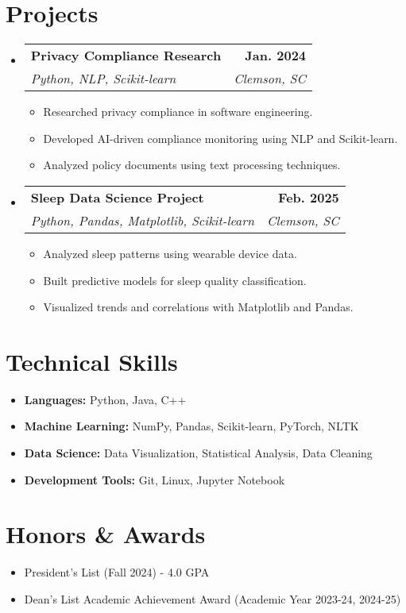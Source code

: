 \documentclass[letterpaper,11pt]{article}
\makeatletter
\newcommand{\resumeSubheading}[4]{
    \vspace{-2pt}\item[]
    \begin{tabular*}{1.0\textwidth}[t]{l@{\extracolsep{\fill}}r}
    \textbf{#1} & \textbf{\small #2} \\
    \textit{\small#3} & \textit{\small #4} \\
    \end{tabular*}\vspace{-7pt}
}
\makeatother
\begin{document}
    \section{Projects}
    \begin{itemize}
        \resumeSubheading{Privacy Compliance Research}{Jan. 2024}{Python, NLP, Scikit-learn}{Clemson, SC}
        \begin{itemize}
            \item Researched privacy compliance in software engineering.
            \item Developed AI-driven compliance monitoring using NLP and Scikit-learn.
            \item Analyzed policy documents using text processing techniques.
        \end{itemize}

        \resumeSubheading{Sleep Data Science Project}{Feb. 2025}{Python, Pandas, Matplotlib, Scikit-learn}{Clemson, SC}
        \begin{itemize}
            \item Analyzed sleep patterns using wearable device data.
            \item Built predictive models for sleep quality classification.
            \item Visualized trends and correlations with Matplotlib and Pandas.
        \end{itemize}
    \end{itemize}

    \section{Technical Skills}
    \begin{itemize}
        \item \textbf{Languages:} Python, Java, C++
        \item \textbf{Machine Learning:} NumPy, Pandas, Scikit-learn, PyTorch, NLTK
        \item \textbf{Data Science:} Data Visualization, Statistical Analysis, Data Cleaning
        \item \textbf{Development Tools:} Git, Linux, Jupyter Notebook
    \end{itemize}

    \section{Honors \& Awards}
    \begin{itemize}
        \item President's List (Fall 2024) - 4.0 GPA
        \item Dean’s List Academic Achievement Award (Academic
        Year 2023-24, 2024-25)
    \end{itemize}
\end{document}
